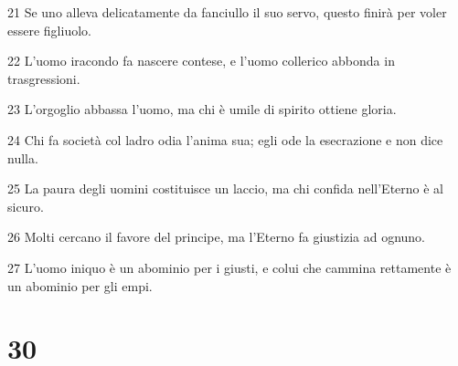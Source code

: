 \par 21 Se uno alleva delicatamente da fanciullo il suo servo, questo finirà per voler essere figliuolo.
\par 22 L'uomo iracondo fa nascere contese, e l'uomo collerico abbonda in trasgressioni.
\par 23 L'orgoglio abbassa l'uomo, ma chi è umile di spirito ottiene gloria.
\par 24 Chi fa società col ladro odia l'anima sua; egli ode la esecrazione e non dice nulla.
\par 25 La paura degli uomini costituisce un laccio, ma chi confida nell'Eterno è al sicuro.
\par 26 Molti cercano il favore del principe, ma l'Eterno fa giustizia ad ognuno.
\par 27 L'uomo iniquo è un abominio per i giusti, e colui che cammina rettamente è un abominio per gli empi.

\chapter{30}

